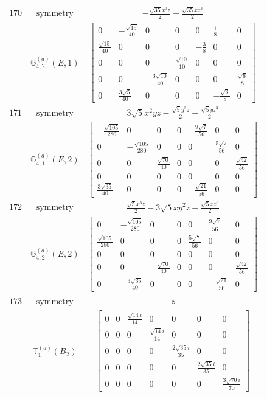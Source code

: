 \documentclass[fleqn,8pt,landscape]{jsarticle}
\begin{document}
\begin{longtable}{ccc}
$ 170 $ & $ \text{symmetry} $ & $ - \frac{\sqrt{35} x^{3} z}{2} + \frac{\sqrt{35} x z^{3}}{2} $ \\
$  $ & $ \mathbb{G}_{4,2}^{(a)}(E,1) $ & $ \begin{bmatrix} 0 & - \frac{\sqrt{15}}{40} & 0 & 0 & 0 & \frac{1}{8} & 0 \\ \frac{\sqrt{15}}{40} & 0 & 0 & 0 & - \frac{3}{8} & 0 & 0 \\ 0 & 0 & 0 & \frac{\sqrt{10}}{10} & 0 & 0 & 0 \\ 0 & 0 & - \frac{3 \sqrt{10}}{40} & 0 & 0 & 0 & \frac{\sqrt{6}}{8} \\ 0 & \frac{3 \sqrt{5}}{40} & 0 & 0 & 0 & - \frac{\sqrt{3}}{8} & 0 \end{bmatrix} $ \\ \hline
$ 171 $ & $ \text{symmetry} $ & $ 3 \sqrt{5} x^{2} y z - \frac{\sqrt{5} y^{3} z}{2} - \frac{\sqrt{5} y z^{3}}{2} $ \\
$  $ & $ \mathbb{G}_{4,1}^{(a)}(E,2) $ & $ \begin{bmatrix} - \frac{\sqrt{105}}{280} & 0 & 0 & 0 & - \frac{9 \sqrt{7}}{56} & 0 & 0 \\ 0 & - \frac{\sqrt{105}}{280} & 0 & 0 & 0 & \frac{5 \sqrt{7}}{56} & 0 \\ 0 & 0 & \frac{\sqrt{70}}{40} & 0 & 0 & 0 & \frac{\sqrt{42}}{56} \\ 0 & 0 & 0 & 0 & 0 & 0 & 0 \\ \frac{3 \sqrt{35}}{40} & 0 & 0 & 0 & - \frac{\sqrt{21}}{56} & 0 & 0 \end{bmatrix} $ \\ \hline
$ 172 $ & $ \text{symmetry} $ & $ \frac{\sqrt{5} x^{3} z}{2} - 3 \sqrt{5} x y^{2} z + \frac{\sqrt{5} x z^{3}}{2} $ \\
$  $ & $ \mathbb{G}_{4,2}^{(a)}(E,2) $ & $ \begin{bmatrix} 0 & - \frac{\sqrt{105}}{280} & 0 & 0 & 0 & \frac{9 \sqrt{7}}{56} & 0 \\ \frac{\sqrt{105}}{280} & 0 & 0 & 0 & \frac{5 \sqrt{7}}{56} & 0 & 0 \\ 0 & 0 & 0 & 0 & 0 & 0 & 0 \\ 0 & 0 & - \frac{\sqrt{70}}{40} & 0 & 0 & 0 & \frac{\sqrt{42}}{56} \\ 0 & - \frac{3 \sqrt{35}}{40} & 0 & 0 & 0 & - \frac{\sqrt{21}}{56} & 0 \end{bmatrix} $ \\ \hline
$ 173 $ & $ \text{symmetry} $ & $ z $ \\
$  $ & $ \mathbb{T}_{1}^{(a)}(B_{2}) $ & $ \begin{bmatrix} 0 & 0 & \frac{\sqrt{14} i}{14} & 0 & 0 & 0 & 0 \\ 0 & 0 & 0 & \frac{\sqrt{14} i}{14} & 0 & 0 & 0 \\ 0 & 0 & 0 & 0 & \frac{2 \sqrt{35} i}{35} & 0 & 0 \\ 0 & 0 & 0 & 0 & 0 & \frac{2 \sqrt{35} i}{35} & 0 \\ 0 & 0 & 0 & 0 & 0 & 0 & \frac{3 \sqrt{70} i}{70} \end{bmatrix} $ \\ \hline

\end{longtable}
\end{document}

